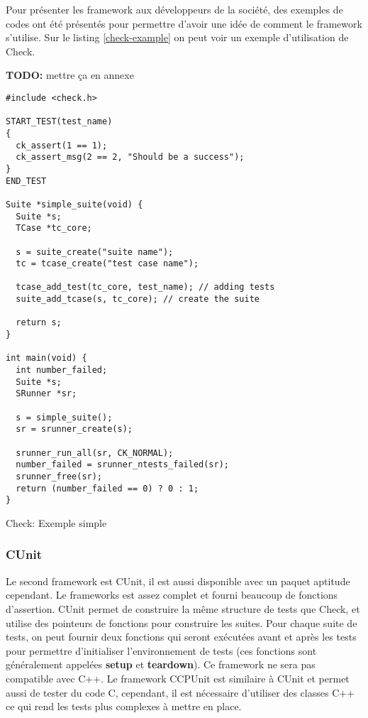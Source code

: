 \documentclass[a4paper]{article}
\begin{document}
Pour présenter les framework aux développeurs de la société, des exemples de
codes ont été présentés pour permettre d'avoir une idée de comment le framework
s'utilise. Sur le listing \ref{check-example} on peut voir un exemple
d'utilisation de Check.

\textbf{TODO:} mettre ça en annexe

\begin{listing}[h!]
\begin{verbatim}
#include <check.h>

START_TEST(test_name)
{
  ck_assert(1 == 1);
  ck_assert_msg(2 == 2, "Should be a success");
}
END_TEST

Suite *simple_suite(void) {
  Suite *s;
  TCase *tc_core;

  s = suite_create("suite name");
  tc = tcase_create("test case name");

  tcase_add_test(tc_core, test_name); // adding tests
  suite_add_tcase(s, tc_core); // create the suite

  return s;
}

int main(void) {
  int number_failed;
  Suite *s;
  SRunner *sr;

  s = simple_suite();
  sr = srunner_create(s);

  srunner_run_all(sr, CK_NORMAL);
  number_failed = srunner_ntests_failed(sr);
  srunner_free(sr);
  return (number_failed == 0) ? 0 : 1;
}
\end{verbatim}
\caption{Check: Exemple simple}
\label{check-example}
\end{listing}
\clearpage

\subsubsection*{CUnit}

Le second framework est CUnit, il est aussi disponible avec un paquet aptitude
cependant. Le frameworks est assez complet et fourni beaucoup de fonctions
d'assertion. CUnit permet de construire la même structure de tests que Check, et
utilise des pointeurs de fonctions pour construire les suites. Pour chaque suite
de tests, on peut fournir deux fonctions qui seront exécutées avant et après les
tests pour permettre d'initialiser l'environnement de tests (ces fonctions sont
généralement appelées \textbf{setup} et \textbf{teardown}). Ce framework ne sera
pas compatible avec C++. Le framework CCPUnit est similaire à CUnit et permet
aussi de tester du code C, cependant, il est nécessaire d'utiliser des classes
C++ ce qui rend les tests plus complexes à mettre en place.
\end{document}
